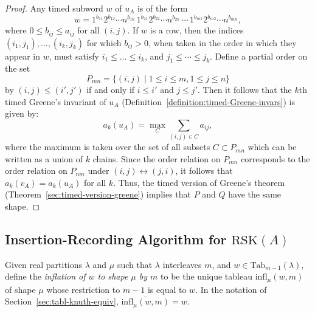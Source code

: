\documentclass[10pt]{amsproc}
\theoremstyle{definition}
\theoremstyle{remark}
\newcommand{\Tab}{\mathrm{Tab}}
\newcommand{\rsk}{\mathrm{RSK}}
\newcommand{\infl}{\mathrm{infl}}
\begin{document}
\begin{proof}
  Any timed subword $w$ of $u_A$ is of the form
  \begin{displaymath}
    w=1^{b_{11}}2^{b_{12}}\dotsb n^{b_{1n}}\,1^{b_{21}}2^{b_{22}}\dotsb n^{b_{2n}}\,\dotsb \,1^{b_{m1}}2^{b_{m2}}\dotsb n^{b_{mn}},    
  \end{displaymath}
  where $0\leq b_{ij}\leq a_{ij}$ for all $(i,j)$.
  If $w$ is a row, then the indices $(i_1,j_1),\dotsc,(i_k,j_k)$ for which $b_{ij}>0$, when taken in the order in which they appear in $w$, must satisfy $i_1\leq \dotsc \leq i_k$, and $j_1\leq \dotsb \leq j_k$.
  Define a partial order on the set
  \begin{displaymath}
    P_{mn} = \{(i,j)\mid 1\leq i\leq m,1\leq j \leq n\}
  \end{displaymath}
  by $(i,j)\leq (i',j')$ if and only if $i\leq i'$ and $j\leq j'$.
  Then it follows that the $k$th timed Greene's invariant of $u_A$ (Definition~\ref{definition:timed-Greene-invars}) is given by:
  \begin{displaymath}
    a_k(u_A) = \max_C \sum_{(i,j)\in C} a_{ij},
  \end{displaymath}
  where the maximum is taken over the set of all subsets $C\subset P_{mn}$ which can be written as a union of $k$ chains.
  Since the order relation on $P_{mn}$ corresponds to the order relation on $P_{nm}$ under $(i,j)\leftrightarrow (j,i)$, it follows that $a_k(v_A)=a_k(u_A)$ for all $k$.
  Thus, the timed version of Greene's theorem (Theorem~\ref{sec:timed-version-greene}) implies that $P$ and $Q$ have the same shape.
\end{proof}

\subsection{Insertion-Recording Algorithm for $\rsk(A)$}
\label{sec:insert-record-algor}
Given real partitions $\lambda$ and $\mu$ such that $\lambda$ interleaves $m$, and $w\in \Tab_{m-1}(\lambda)$, define the \emph{inflation of $w$ to shape $\mu$ by $m$} to be the unique tableau $\infl_\mu(w,m)$ of shape $\mu$ whose restriction to $m-1$ is equal to $w$.
In the notation of Section~\ref{sec:tabl-knuth-equiv}, $\bar{\infl_\mu(w,m)}=w$. 
\end{document}
